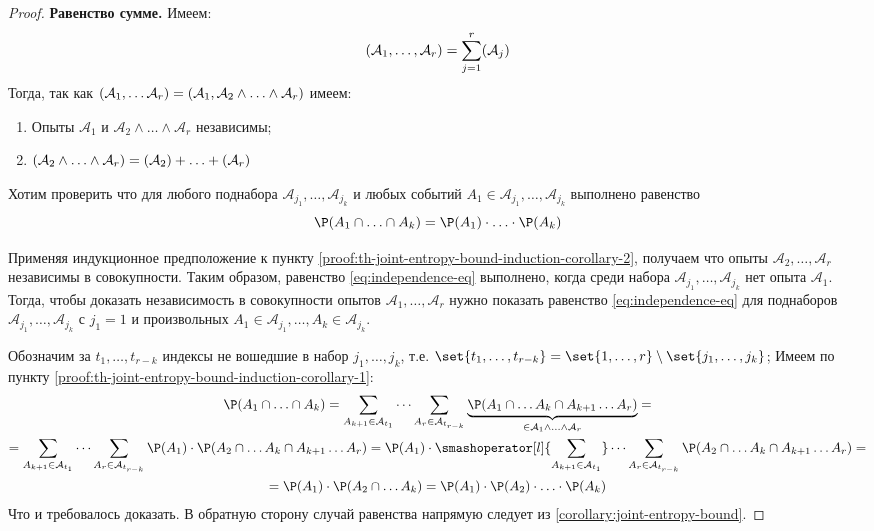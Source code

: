 \begin{proof}
	\noindent \textbf{Равенство сумме.} Имеем:
	\[
		\relax(\mathcal{A}_1, \ldots, \mathcal{A}_r) = \sum_{j = 1}^{r} \relax(\mathcal{A}_j)
	\]
	Тогда, так как \(\relax(\mathcal{A}_1, \ldots \mathcal{A}_r)= \relax(\mathcal{A}_1, \mathcal{A}_2 \land \ldots \land \mathcal{A}_r)\) имеем:
	\begin{enumerate}[compact]
		\item\label{proof:th-joint-entropy-bound-induction-corollary-1} Опыты $\mathcal{A}_1$ и $\mathcal{A}_2 \land \ldots \land \mathcal{A}_r$ независимы;
		\item \label{proof:th-joint-entropy-bound-induction-corollary-2} $\relax(\mathcal{A}_2 \land \ldots \land \mathcal{A}_r) = \relax(\mathcal{A}_2) + \ldots +\relax(\mathcal{A}_r)$ 
	\end{enumerate}
	Хотим проверить что для любого поднабора $\mathcal{A}_{j_1}, \ldots, \mathcal{A}_{j_k}$ и любых событий $A_1 \in \mathcal{A}_{j_1}, \ldots, \mathcal{A}_{j_k}$ выполнено равенство
	\begin{equation}
		\label{eq:independence-eq}
		\P(A_1 \cap \ldots \cap A_k) = \P(A_1) \cdot \ldots \cdot \P(A_k)
	\end{equation}

	Применяя индукционное предположение к пункту \ref{proof:th-joint-entropy-bound-induction-corollary-2}, получаем что опыты $\mathcal{A}_2, \ldots, \mathcal{A}_r$ независимы в совокупности. Таким образом, равенство \eqref{eq:independence-eq} выполнено, когда среди набора $\mathcal{A}_{j_1}, \ldots, \mathcal{A}_{j_k}$ нет опыта $\mathcal{A}_1$.  Тогда, чтобы доказать независимость в совокупности опытов $\mathcal{A}_1, \ldots, \mathcal{A}_r$ нужно показать равенство \eqref{eq:independence-eq} для поднаборов $\mathcal{A}_{j_1}, \ldots, \mathcal{A}_{j_k}$ с $j_1 = 1$ и произвольных  $A_1 \in \mathcal{A}_{j_1}, \ldots,  A_{k} \in \mathcal{A}_{j_k}$.

	Обозначим за $t_1, \ldots, t_{r-k}$ индексы не вошедшие в набор $j_1, \ldots, j_k$, т.е. $\set{t_1, \ldots, t_{r-k}} = \set{1, \ldots, r} \setminus \set{j_1, \ldots, j_k}$; Имеем по пункту \ref{proof:th-joint-entropy-bound-induction-corollary-1}:
	\begin{multline*}
		\P(A_1 \cap \ldots \cap A_k)
		= \sum_{A_{k+1} \in \mathcal{A}_{t_1}} \cdots  \sum_{A_{r} \in \mathcal{A}_{t_{r-k}}} \underbrace{\P(A_1 \cap \ldots A_k \cap A_{k+1} \ldots A_{r})}_{\in \mathcal{A}_1 \land \ldots \land \mathcal{A}_r} = \\
		= \sum_{A_{k+1} \in \mathcal{A}_{t_1}} {\cdots} \sum_{A_{r} \in \mathcal{A}_{t_{r-k}}} \P(A_1) \cdot \P(A_2 \cap \ldots A_k \cap A_{k+1} \ldots A_{r})  
		= \P(A_1) \cdot \smashoperator[l]{\sum_{A_{k+1} \in \mathcal{A}_{t_1}}} \cdots \sum_{A_{r} \in \mathcal{A}_{t_{r-k}}} \P(A_2 \cap \ldots A_k \cap A_{k+1} \ldots A_{r}) = \\ 
		 = \P(A_1) \cdot \P(A_2 \cap \ldots A_k) 
		 = \P(A_1) \cdot \P(A_2) \cdot \ldots \cdot \P(A_k)
	 \end{multline*}
	 Что и требовалось доказать. В обратную сторону случай равенства напрямую следует из \ref{corollary:joint-entropy-bound}.
\end{proof}

